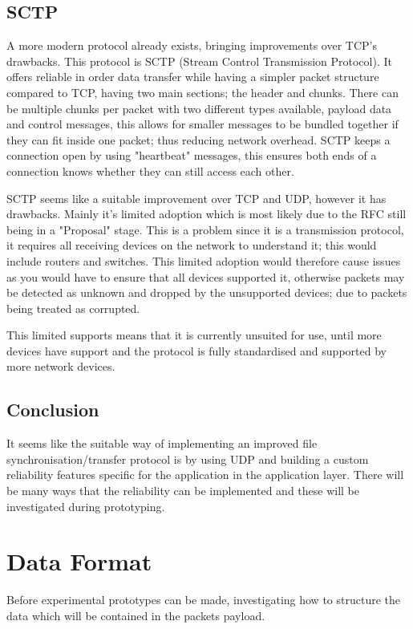 \subsection*{SCTP}
A more modern protocol already exists, bringing improvements over TCP's drawbacks. This protocol is SCTP (Stream Control Transmission Protocol). It offers reliable in order data transfer while having a simpler packet structure compared to TCP, having two main sections; the header and chunks. There can be multiple chunks per packet with two different types available, payload data and control messages, this allows for smaller messages to be bundled together if they can fit inside one packet; thus reducing network overhead. SCTP keeps a connection open by using "heartbeat" messages, this ensures both ends of a connection knows whether they can still access each other.

SCTP seems like a suitable improvement over TCP and UDP, however it has drawbacks. Mainly it's limited adoption which is most likely due to the RFC still being in a "Proposal" stage. This is a problem since it is a transmission protocol, it requires all receiving devices on the network to understand it; this would include routers and switches. This limited adoption would therefore cause issues as you would have to ensure that all devices supported it, otherwise packets may be detected as unknown and dropped by the unsupported devices; due to packets being treated as corrupted.

This limited supports means that it is currently unsuited for use, until more devices have support and the protocol is fully standardised and supported by more network devices.

\subsection*{Conclusion}
It seems like the suitable way of implementing an improved file synchronisation/transfer protocol is by using UDP and building a custom reliability features specific for the application in the application layer. There will be many ways that the reliability can be implemented and these will be investigated during prototyping.


\section{Data Format}
Before experimental prototypes can be made, investigating how to structure the data which will be contained in the packets payload.

